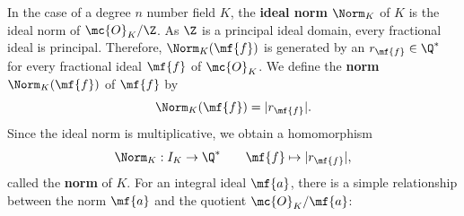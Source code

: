     In the case of a degree \(n\) number field \(K\), the \textbf{ideal norm} \(\Norm_{K}\) of \(K\) is the ideal norm of \(\mc{O}_{K}/\Z\). As \(\Z\) is a principal ideal domain, every fractional ideal is principal. Therefore, \(\Norm_{K}(\mf{f})\) is generated by an \(r_{\mf{f}} \in \Q^{\ast}\) for every fractional ideal \(\mf{f}\) of \(\mc{O}_{K}\). We define the \textbf{norm} \(\Norm_{K}(\mf{f})\) of \(\mf{f}\) by
    \[
      \Norm_{K}(\mf{f}) = |r_{\mf{f}}|.
    \]
    Since the ideal norm is multiplicative, we obtain a homomorphism
    \[
      \Norm_{K}:I_{K} \to \Q^{\ast} \qquad \mf{f} \mapsto |r_{\mf{f}}|,
    \]
    called the \textbf{norm} of \(K\). For an integral ideal \(\mf{a}\), there is a simple relationship between the norm \(\mf{a}\) and the quotient \(\mc{O}_{K}/\mf{a}\):

